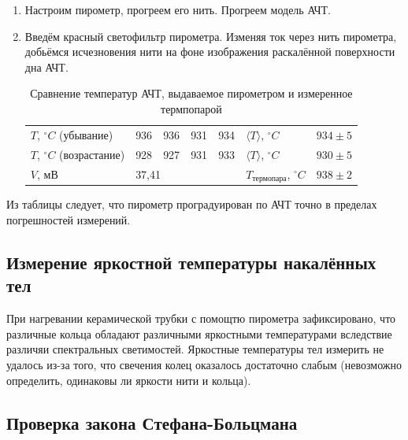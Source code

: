 \begin{enumerate}
    \item Настроим пирометр, прогреем его нить. Прогреем модель АЧТ.
    \item Введём красный светофильтр пирометра. Изменяя ток через нить пирометра, добьёмся исчезновения нити на фоне изображения раскалённой поверхности дна АЧТ.

    \begin{table}[h]
        \centering
        \begin{center}
            \caption{Сравнение температур АЧТ, выдаваемое пирометром и измеренное термпопарой}
        \end{center}
        \begin{tabular}{|l|l|l|l|l|l|l|}
        \hline
        $T$, $^\circ C$ (убывание)          & 936  & 936 & 931 & 934 & $\langle T \rangle $, $^\circ C$ & $934 \pm 5$  \\ \cline{1-5} \cline{7-7} 
        $T$, $^\circ C$ (возрастание)       & 928  & 927 & 931 & 933 & $\langle T \rangle $, $^\circ C$ & $930 \pm 5$ \\ \hline
        $V$, мВ                            & \multicolumn{4}{l|}{37,41} & $T_{\text{термопара}}$, $^\circ C$              & $938 \pm 2$        \\ \hline
        \end{tabular}
        \label{table:comparison}
    \end{table}

\end{enumerate}

    Из таблицы следует, что пирометр проградуирован по АЧТ точно в пределах погрешностей измерений.

\subsection{Измерение яркостной температуры накалённых тел}

    При нагревании керамической трубки с помощтю пирометра зафиксировано, что различные кольца обладают различными яркостными температурами вследствие различяи спектральных светимостей. Яркостные температуры тел измерить не удалось из-за того, что свечения колец оказалось достаточно слабым (невозможно определить, одинаковы ли яркости нити и кольца).

\subsection{Проверка закона Стефана-Больцмана}

